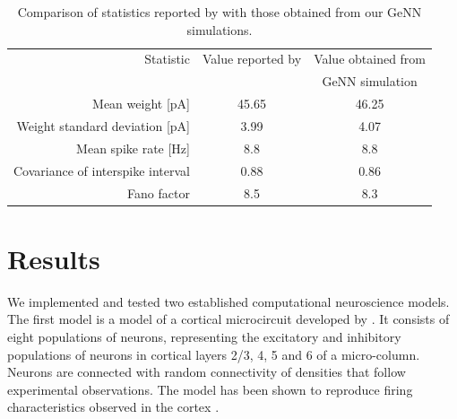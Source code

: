 \documentclass[utf8]{frontiersSCNS} %
\begin{document}
\begin{table}
  \centering
  \begin{tabular}{r S S}
    \toprule
        {Statistic}                                     & {Value reported by}       & {Value obtained from} \\
                                                        & {\citet{Morrison2007}}    & {GeNN simulation} \\
    \midrule
        Mean weight [\si{\pico\ampere}]                 & 45.65                     & 46.25 \\
        Weight standard deviation [\si{\pico\ampere}]   & 3.99                      & 4.07 \\
        Mean spike rate [\si{\hertz}]                   & 8.8                       & 8.8 \\
        Covariance of interspike interval               & 0.88                      & 0.86 \\
        Fano factor                                     & 8.5                       & 8.3 \\
    \bottomrule
  \end{tabular}

  \caption{Comparison of statistics reported by \citet{Morrison2007} with those obtained from our GeNN simulations.}
  \label{tab:mad_stats}
\end{table}

\section{Results}
We implemented and tested two established computational neuroscience models. The first model is a model of a cortical microcircuit developed by \citet{Potjans2012}.
It consists of eight populations of neurons, representing the excitatory and inhibitory populations of neurons in cortical layers 2/3, 4, 5 and 6 of a micro-column.
Neurons are connected with random connectivity of densities that follow experimental observations.
The model has been shown to reproduce firing characteristics observed in the cortex \citep{Potjans2012}. 
\end{document}
